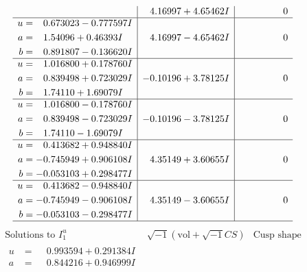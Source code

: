 \documentclass[1p]{elsarticle_modified}
\theoremstyle{definition}
\newcommand{\I}{\sqrt{-1}}
\begin{document}
$$\begin{array}{c|c|c}
 & \phantom{-}4.16997 + 4.65462 I & \phantom{-0.000000 } 0 \\ \hline\begin{aligned}
u &= \phantom{-}0.673023 - 0.777597 I \\
a &= \phantom{-}1.54096 + 0.46393 I \\
b &= \phantom{-}0.891807 - 0.136620 I\end{aligned}
 & \phantom{-}4.16997 - 4.65462 I & \phantom{-0.000000 } 0 \\ \hline\begin{aligned}
u &= \phantom{-}1.016800 + 0.178760 I \\
a &= \phantom{-}0.839498 + 0.723029 I \\
b &= \phantom{-}1.74110 + 1.69079 I\end{aligned}
 & -0.10196 + 3.78125 I & \phantom{-0.000000 } 0 \\ \hline\begin{aligned}
u &= \phantom{-}1.016800 - 0.178760 I \\
a &= \phantom{-}0.839498 - 0.723029 I \\
b &= \phantom{-}1.74110 - 1.69079 I\end{aligned}
 & -0.10196 - 3.78125 I & \phantom{-0.000000 } 0 \\ \hline\begin{aligned}
u &= \phantom{-}0.413682 + 0.948840 I \\
a &= -0.745949 + 0.906108 I \\
b &= -0.053103 + 0.298477 I\end{aligned}
 & \phantom{-}4.35149 + 3.60655 I & \phantom{-0.000000 } 0 \\ \hline\begin{aligned}
u &= \phantom{-}0.413682 - 0.948840 I \\
a &= -0.745949 - 0.906108 I \\
b &= -0.053103 - 0.298477 I\end{aligned}
 & \phantom{-}4.35149 - 3.60655 I & \phantom{-0.000000 } 0\\
 \hline 
 \end{array}$$\newpage$$\begin{array}{c|c|c}  
\text{Solutions to }I^u_{1}& \I (\text{vol} + \sqrt{-1}CS) & \text{Cusp shape}\\
 \hline 
\begin{aligned}
u &= \phantom{-}0.993594 + 0.291384 I \\
a &= \phantom{-}0.844216 + 0.946999 I \\

\end{aligned}
\end{array}$$
\end{document}
